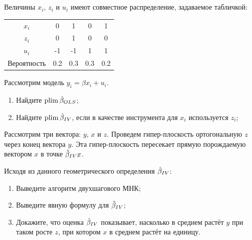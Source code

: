 \begin{problem}

  \begin{sol}
  \end{sol}
\end{problem}







\section{}




\begin{problem}
Величины $x_i$, $z_i$ и $u_i$ имеют совместное распределение, задаваемое табличкой:

\begin{tabular}{ccccc}
  \toprule
  $x_i$ & 0 & 1 & 0 & 1 \\
  $z_i$ & 0 & 1 & 0 & 0 \\
  $u_i$ & -1 & -1 & 1 & 1 \\
  \midrule
  Вероятность & 0.2 & 0.3 & 0.3 & 0.2 \\
  \bottomrule
\end{tabular}

Рассмотрим модель $y_i = \beta x_i + u_i$.

\begin{enumerate}
  \item Найдите $\operatorname*{plim} \hat{\beta}_{OLS}$;
  \item Найдите $\operatorname*{plim} \hat{\beta}_{IV}$, если в качестве инструмента для $x_i$ используется $z_i$;
\end{enumerate}

\begin{sol}
\end{sol}
\end{problem}

\begin{problem}
Рассмотрим три вектора: $y$, $x$ и $z$.
Проведем гипер-плоскость ортогональную $z$ через конец вектора $y$.
Эта гипер-плоскость пересекает прямую порождаемую вектором $x$ в точке $\hat{\beta}_{IV}x$.

Исходя из данного геометрического определения $\hat{\beta}_{IV}$:
\begin{enumerate}
  \item Выведите алгоритм двухшагового МНК;
  \item Выведите явную формулу для $\hat{\beta}_{IV}$;
  \item Докажите, что оценка $\hat{\beta}_{IV}$ показывает, насколько в среднем растёт $y$ при таком росте $z$, при котором $x$ в среднем растёт на единицу.
\end{enumerate}

  \begin{sol}
  \end{sol}

\end{problem}


